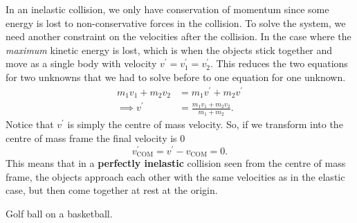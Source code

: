 \documentclass[../classical_mechanics.tex]{subfiles}
\begin{document}
        In an inelastic collision, we only have conservation of momentum since some energy is lost to non-conservative forces in the collision.
        To solve the system, we need another constraint on the velocities after the collision.
        In the case where the \textit{maximum} kinetic energy is lost, which is when the objects stick together and move as a single body with velocity $v^\prime=v_1^\prime=v_2^\prime$.
        This reduces the two equations for two unknowns that we had to solve before to one equation for one unknown.
        \begin{align}
            m_1v_1+m_2v_2&=m_1v^\prime+m_2v^\prime\\
            \implies v^\prime&=\frac{m_1v_1+m_2v_2}{m_1+m_2}.
        \end{align}
        Notice that $v^\prime$ is simply the centre of mass velocity.
        So, if we transform into the centre of mass frame the final velocity is 0
        \begin{equation}
            v_\text{COM}^\prime=v^\prime-v_\text{COM}=0.
        \end{equation}
        This means that in a \textbf{perfectly inelastic} collision seen from the centre of mass frame, the objects approach each other with the same velocities as in the elastic case, but then come together at rest at the origin.
        \begin{example}
            Golf ball on a basketball.
        \end{example}
\end{document}
